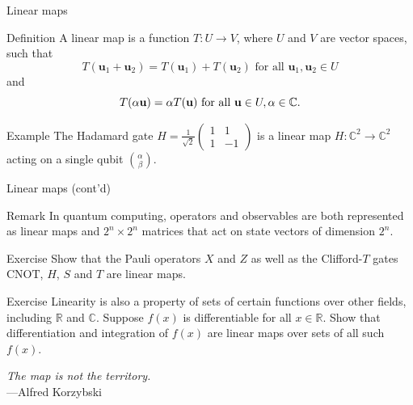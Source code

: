 \documentclass{beamer}
\newcommand{\C}{\mathbb{C}}
\newcommand{\R}{\mathbb{R}}
\newcommand{\CNOT}{\text{CNOT}}
\begin{document}
\begin{frame}{Linear maps}

\begin{block}{Definition}
A linear map is a function $T:U\to V$, where $U$ and $V$ are vector spaces, such that
$$ T(\textbf{u}_1 + \textbf{u}_2) = T(\textbf{u}_1) + T(\textbf{u}_2)\text{ for all } \textbf{u}_1,\textbf{u}_2\in U$$
and
$$ T(\alpha \textbf u) = \alpha T(\textbf u) \text{ for all } \textbf u\in U,\alpha \in \C.$$
\end{block}

\begin{block}{Example}
The Hadamard gate
$ H = \frac{1}{\sqrt 2} \begin{pmatrix}
    1 & 1 \\
    1 & -1
\end{pmatrix}$
is a linear map $H:\C^2 \to \C^2$ acting on a single qubit $\binom{\alpha}{\beta}$.
\end{block}
    
\end{frame}

\begin{frame}{Linear maps (cont'd)}
    \begin{block}{Remark}
        In quantum computing, operators and observables are both represented as linear maps and $2^n \times 2^n$ matrices that act on state vectors of dimension $2^n$.
    \end{block}
    \begin{block}{Exercise}
        Show that the Pauli operators $X$ and $Z$ as well as the Clifford-$T$ gates $\CNOT$, $H$, $S$ and $T$ are linear maps.
    \end{block}
    \begin{block}{Exercise}
        Linearity is also a property of sets of certain functions over other fields, including $\R$ and $\C$. Suppose $f(x)$ is differentiable for all $x \in \R$. Show that differentiation and integration of $f(x)$ are linear maps over sets of all such $f(x)$.
    \end{block}
    \begin{flushright}
        \textit{The map is not the territory.}\\---Alfred Korzybski
    \end{flushright}
\end{frame}
\end{document}
